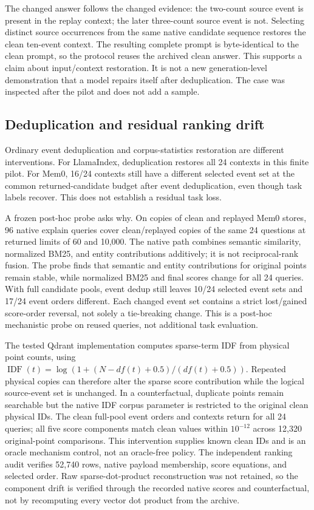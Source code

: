 \documentclass[10pt,letterpaper]{article}
\begin{document}
The changed answer follows the changed evidence: the two-count source event is present in the replay context; the later three-count source event is not. Selecting distinct source occurrences from the same native candidate sequence restores the clean ten-event context. The resulting complete prompt is byte-identical to the clean prompt, so the protocol reuses the archived clean answer. This supports a claim about input/context restoration. It is not a new generation-level demonstration that a model repairs itself after deduplication. The case was inspected after the pilot and does not add a sample.

\subsection{Deduplication and residual ranking drift}
Ordinary event deduplication and corpus-statistics restoration are different interventions. For LlamaIndex, deduplication restores all 24 contexts in this finite pilot. For Mem0, 16/24 contexts still have a different selected event set at the common returned-candidate budget after event deduplication, even though task labels recover. This does not establish a residual task loss.

A frozen post-hoc probe asks why. On copies of clean and replayed Mem0 stores, 96 native explain queries cover clean/replayed copies of the same 24 questions at returned limits of 60 and 10,000. The native path combines semantic similarity, normalized BM25, and entity contributions additively; it is not reciprocal-rank fusion. The probe finds that semantic and entity contributions for original points remain stable, while normalized BM25 and final scores change for all 24 queries. With full candidate pools, event dedup still leaves 10/24 selected event sets and 17/24 event orders different. Each changed event set contains a strict lost/gained score-order reversal, not solely a tie-breaking change. This is a post-hoc mechanistic probe on reused queries, not additional task evaluation.

The tested Qdrant implementation computes sparse-term IDF from physical point counts, using $\operatorname{IDF}(t)=\log(1+(N-df(t)+0.5)/(df(t)+0.5))$. Repeated physical copies can therefore alter the sparse score contribution while the logical source-event set is unchanged. In a counterfactual, duplicate points remain searchable but the native IDF corpus parameter is restricted to the original clean physical IDs. The clean full-pool event orders and contexts return for all 24 queries; all five score components match clean values within $10^{-12}$ across 12,320 original-point comparisons. This intervention supplies known clean IDs and is an oracle mechanism control, not an oracle-free policy. The independent ranking audit verifies 52,740 rows, native payload membership, score equations, and selected order. Raw sparse-dot-product reconstruction was not retained, so the component drift is verified through the recorded native scores and counterfactual, not by recomputing every vector dot product from the archive.
\end{document}
